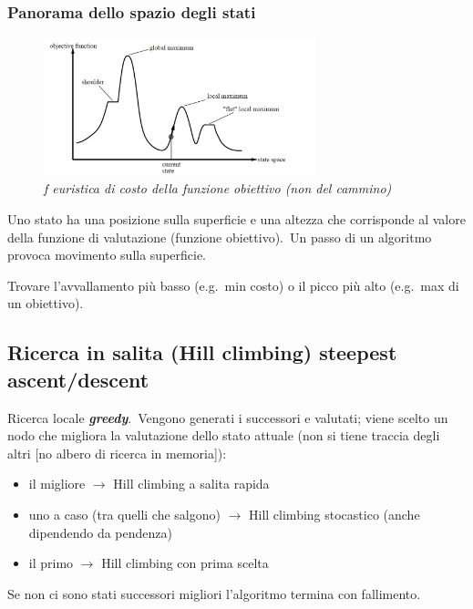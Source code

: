 \subsubsection{Panorama dello spazio degli stati}

\begin{figure}[H]
	\centering
	\includegraphics[width=0.7\textwidth]{immagini/spazio_stati.jpg}
	\caption*{\textit{f euristica di costo della funzione obiettivo (non del cammino)}}
\end{figure}

Uno stato ha una posizione sulla superficie e una altezza che corrisponde al valore della funzione di valutazione (funzione obiettivo).\
Un passo di un algoritmo provoca movimento sulla superficie.\

Trovare l'avvallamento più basso (e.g.\ min costo) o il picco più alto (e.g.\ max di un obiettivo).

\subsection{Ricerca in salita (Hill climbing) steepest ascent{\slash}descent}

Ricerca locale \textbf{\textit{greedy}}.\
Vengono generati i successori e valutati; viene scelto un nodo che migliora la valutazione dello stato attuale (non si tiene traccia degli altri [no albero di ricerca in memoria]):\
\begin{itemize}
	\item il migliore $\rightarrow$ Hill climbing a salita rapida
	\item uno a caso (tra quelli che salgono) $\rightarrow$ Hill climbing stocastico (anche dipendendo da pendenza)
	\item il primo $\rightarrow$ Hill climbing con prima scelta
\end{itemize}
Se non ci sono stati successori migliori l'algoritmo termina con fallimento.\

